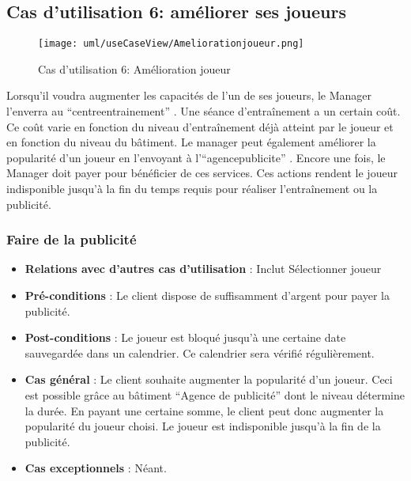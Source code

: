 \documentclass[a4paper,titlepage]{scrreprt}
\begin{document}
  \subsection{Cas d'utilisation 6: améliorer ses joueurs}
  \begin{figure}[H]
    \center
    \texttt{[image: uml/useCaseView/Ameliorationjoueur.png]}
    \caption{Cas d'utilisation 6: Amélioration joueur}
  \end{figure}
  Lorsqu'il voudra augmenter les capacités de l'un de ses joueurs, 
  le Manager l'enverra au \enquote{\gls{centreentrainement}} . 
  Une séance d'entraînement a un certain coût. 
  Ce coût varie en fonction du niveau d'entraînement déjà atteint par le joueur et en fonction du niveau du bâtiment.
  Le manager peut également améliorer la popularité d'un joueur en l'envoyant à l'\enquote{\gls{agencepublicite}} . Encore une fois, le Manager doit payer pour bénéficier de ces services. Ces actions rendent le joueur indisponible jusqu'à la fin du temps requis pour réaliser l'entraînement ou la publicité.
    \subsubsection{Faire de la publicité}
      \begin{itemize}
        \item \textbf{Relations avec d'autres cas d'utilisation}  : Inclut Sélectionner joueur
        \item \textbf{Pré-conditions} : Le client dispose de suffisamment d’argent pour payer la publicité.
        \item \textbf{Post-conditions} : Le joueur est bloqué jusqu'à une certaine date sauvegardée dans un calendrier. Ce calendrier sera vérifié régulièrement.
        \item \textbf{Cas général} : Le client souhaite augmenter la popularité d'un joueur. Ceci est possible grâce au bâtiment \enquote{Agence de publicité} dont le niveau détermine la durée. En payant une certaine somme, le client peut donc augmenter la popularité du joueur choisi. Le joueur est indisponible jusqu’à la fin de la publicité.

        \item \textbf{Cas exceptionnels} : Néant.
      \end{itemize}
\end{document}
